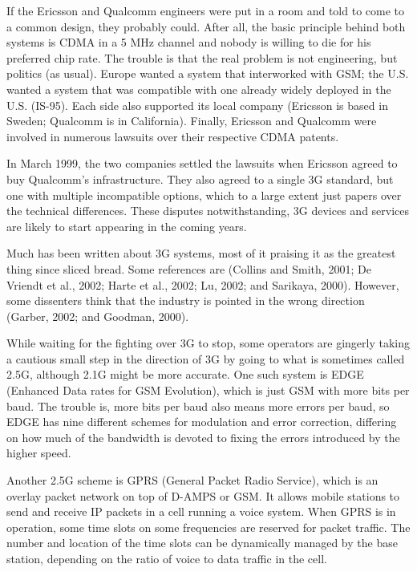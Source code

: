 If the Ericsson and Qualcomm engineers were put in a room and told to
come to a common design, they probably could. After all, the basic
principle behind both systems is CDMA in a 5 MHz channel and nobody is
willing to die for his preferred chip rate. The trouble is that the real
problem is not engineering, but politics (as usual). Europe wanted a
system that interworked with GSM; the U.S. wanted a system that was
compatible with one already widely deployed in the U.S. (IS-95). Each
side also supported its local company (Ericsson is based in Sweden;
Qualcomm is in California). Finally, Ericsson and Qualcomm were involved
in numerous lawsuits over their respective CDMA patents.

In March 1999, the two companies settled the lawsuits when Ericsson
agreed to buy Qualcomm's infrastructure. They also agreed to a single 3G
standard, but one with multiple incompatible options, which to a large
extent just papers over the technical differences. These disputes
notwithstanding, 3G devices and services are likely to start appearing
in the coming years.

Much has been written about 3G systems, most of it praising it as the
greatest thing since sliced bread. Some references are (Collins and
Smith, 2001; De Vriendt et al., 2002; Harte et al., 2002; Lu, 2002; and
Sarikaya, 2000). However, some dissenters think that the industry is
pointed in the wrong direction (Garber, 2002; and Goodman, 2000).

While waiting for the fighting over 3G to stop, some operators are
gingerly taking a cautious small step in the direction of 3G by going to
what is sometimes called {2.5G}, although 2.1G might be more accurate.
One such system is {EDGE} ({Enhanced Data rates for GSM Evolution}),
which is just GSM with more bits per baud. The trouble is, more bits per
baud also means more errors per baud, so EDGE has nine different schemes
for modulation and error correction, differing on how much of the
bandwidth is devoted to fixing the errors introduced by the higher
speed.

Another 2.5G scheme is {GPRS} ({General Packet Radio Service}), which is
an overlay packet network on top of D-AMPS or GSM. It allows mobile
stations to send and receive IP packets in a cell running a voice
system. When GPRS is in operation, some time slots on some frequencies
are reserved for packet traffic. The number and location of the time
slots can be dynamically managed by the base station, depending on the
ratio of voice to data traffic in the cell.

